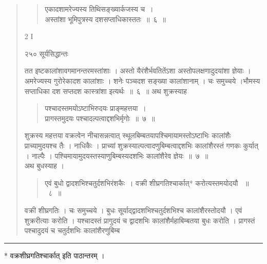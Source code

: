 \documentclass[11pt, openany]{book}
\begin{document}
\begin{quote}
\begin{quote}
{\ssi एकादशामरेज्यस्य तिथिसङ्ख्यार्कजस्य च~। \\
अस्तांशा भूमिपुत्रस्य दशसप्ताधिकास्ततः~॥~६~॥}
\end{quote}
{\tiny{2 I}}


\newpage

\noindent २५० \hspace{4cm} सूर्यसिद्धान्तः 
\vspace{1cm}


 तत इष्टकालांशावगमानन्तरमस्तांशाः । अस्तो यैरंशैर्भवतितेंऽशा अस्तोपलक्षणादुदयांशा ज्ञेयाः । अमरेज्यस्य गुरोरेकादश कालांशाः । शनेः पञ्चदश सङ्ख्या कालांशानाम् । चः समुच्चये ।भौमस्य सप्ताधिका दश सप्तदश कास्त्रांशा इत्यर्थः~॥~६~॥
\noindent अथ शुक्रस्याह \textendash


\begin{quote}
{\ssi पश्चादस्तमयोऽष्टाभिरुदयः प्राङ्महत्तया~।\\
 प्रागस्तमुदयः पश्चादल्पत्वाद्दशभिर्मृगोः~॥~७~॥}
\end{quote}

 शुक्रस्य महत्तया वक्रत्वेन नीचासन्नत्वात् स्थूलबिम्बतयापश्चिमायामस्तोऽष्टाभिः कालांशैः प्राच्यामुदयश्च तैः । नाधिकैः । प्राच्यां शुक्रस्याल्पत्वादणुबिम्बत्वाद्दशभिः कालांशैरस्तं गणकः कुर्यात् । नाल्पैः । पश्चिमायामुदयस्तस्याणुबिम्बस्यदशभिः कालांशैरेव ज्ञेयः~॥~७~॥\\
 \noindent अथ बुधस्याह ।\textendash


\begin{quote}
{\ssi एवं बुधो द्वादशभिश्चतुर्दशभिरंशकैः~।
 वक्री शीघ्रगतिश्चार्कात्* करोत्यस्तमयोदयौ ~॥~८~॥}
\end{quote}

 वक्री शीघ्रगतिः । चः समुच्चये । बुधः सूर्याद्द्वादशभिश्चतुर्दशभिश्च कालांशैरस्तोदयौ । एवं शुक्ररीत्याः करोति । यश्चादस्तं प्रागुदयं च द्वादशभिः कालांशैर्महाबिम्बतया बुधः करोति । प्रागस्तं पश्चादुदयं च चतुर्दशभिः कालांशैरणुबिम्ब \textendash

\end{quote}
\noindent\rule{\linewidth}{.5pt}

\begin{center}
 * वक्रशीघ्रगतिश्चार्कात् इति पाठान्तरम् ।
\end{center}
\end{document}
